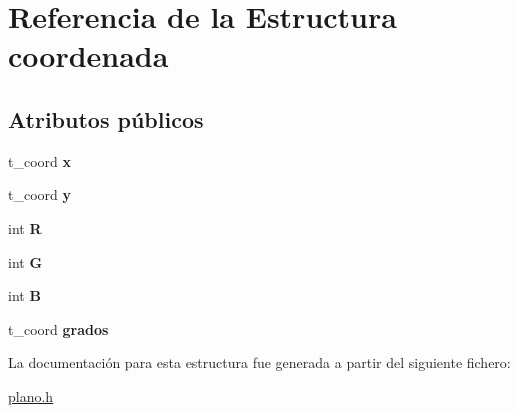 \hypertarget{structcoordenada}{}\section{Referencia de la Estructura coordenada}
\label{structcoordenada}
\subsection*{Atributos públicos}
\begin{DoxyCompactItemize}
\item 
\mbox{\label{structcoordenada_a58f4bd357e0e907cc46bcd35f5271e8e}} 
t\+\_\+coord {\bfseries x}
\item 
\mbox{\label{structcoordenada_a0048d987a8afd0cf94b8ec4a155fcad5}} 
t\+\_\+coord {\bfseries y}
\item 
\mbox{\label{structcoordenada_a379001d7331a9ecd1b85521e6c1162d3}} 
int {\bfseries R}
\item 
\mbox{\label{structcoordenada_a69897a5bd2f9713376d0dc541fd96de2}} 
int {\bfseries G}
\item 
\mbox{\label{structcoordenada_ad39661406d2665ff1efe3c695e81a933}} 
int {\bfseries B}
\item 
\mbox{\label{structcoordenada_a35322c013bfbef19997d61111767446f}} 
t\+\_\+coord {\bfseries grados}
\end{DoxyCompactItemize}


La documentación para esta estructura fue generada a partir del siguiente fichero\+:\begin{DoxyCompactItemize}
\item 
\hyperlink{plano_8h}{plano.\+h}\end{DoxyCompactItemize}
